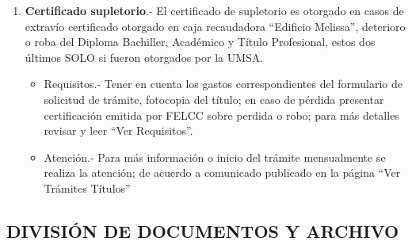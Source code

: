 \documentclass[letter, openright, 12pt]{book}
\begin{document}
\begin{enumerate}[label=(\alph*)]
\item \textbf{Certificado supletorio}.- El certificado de supletorio es otorgado en casos de extravío certificado otorgado en caja recaudadora “Edificio Melissa”, deterioro o roba del Diploma Bachiller, Académico y Título Profesional, estos dos últimos SOLO si fueron otorgados por la UMSA.
\begin{itemize}
\item Requisitos.- Tener en cuenta los gastos correspondientes del formulario de solicitud de trámite, fotocopia del título; en caso de pérdida presentar certificación emitida por FELCC sobre perdida o robo; para más detalles revisar y leer “Ver Requisitos”.
\item Atención.- Para más información o inicio del trámite mensualmente se realiza la atención; de acuerdo a comunicado publicado en la página “Ver Trámites Títulos”
\end{itemize}
\end{enumerate}

\subsection{DIVISIÓN DE DOCUMENTOS Y ARCHIVO}
\end{document}
